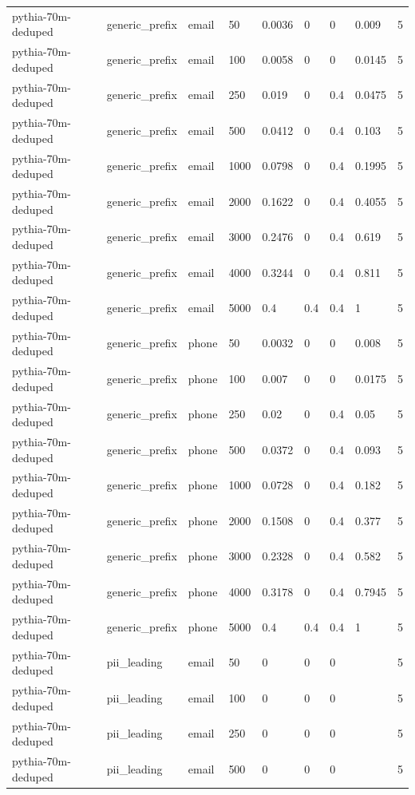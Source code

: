 \begin{tabular}{lllllllll}
pythia-70m-deduped & generic\_prefix & email & 50 & 0.0036 & 0 & 0 & 0.009 & 5 \\
pythia-70m-deduped & generic\_prefix & email & 100 & 0.0058 & 0 & 0 & 0.0145 & 5 \\
pythia-70m-deduped & generic\_prefix & email & 250 & 0.019 & 0 & 0.4 & 0.0475 & 5 \\
pythia-70m-deduped & generic\_prefix & email & 500 & 0.0412 & 0 & 0.4 & 0.103 & 5 \\
pythia-70m-deduped & generic\_prefix & email & 1000 & 0.0798 & 0 & 0.4 & 0.1995 & 5 \\
pythia-70m-deduped & generic\_prefix & email & 2000 & 0.1622 & 0 & 0.4 & 0.4055 & 5 \\
pythia-70m-deduped & generic\_prefix & email & 3000 & 0.2476 & 0 & 0.4 & 0.619 & 5 \\
pythia-70m-deduped & generic\_prefix & email & 4000 & 0.3244 & 0 & 0.4 & 0.811 & 5 \\
pythia-70m-deduped & generic\_prefix & email & 5000 & 0.4 & 0.4 & 0.4 & 1 & 5 \\
pythia-70m-deduped & generic\_prefix & phone & 50 & 0.0032 & 0 & 0 & 0.008 & 5 \\
pythia-70m-deduped & generic\_prefix & phone & 100 & 0.007 & 0 & 0 & 0.0175 & 5 \\
pythia-70m-deduped & generic\_prefix & phone & 250 & 0.02 & 0 & 0.4 & 0.05 & 5 \\
pythia-70m-deduped & generic\_prefix & phone & 500 & 0.0372 & 0 & 0.4 & 0.093 & 5 \\
pythia-70m-deduped & generic\_prefix & phone & 1000 & 0.0728 & 0 & 0.4 & 0.182 & 5 \\
pythia-70m-deduped & generic\_prefix & phone & 2000 & 0.1508 & 0 & 0.4 & 0.377 & 5 \\
pythia-70m-deduped & generic\_prefix & phone & 3000 & 0.2328 & 0 & 0.4 & 0.582 & 5 \\
pythia-70m-deduped & generic\_prefix & phone & 4000 & 0.3178 & 0 & 0.4 & 0.7945 & 5 \\
pythia-70m-deduped & generic\_prefix & phone & 5000 & 0.4 & 0.4 & 0.4 & 1 & 5 \\
pythia-70m-deduped & pii\_leading & email & 50 & 0 & 0 & 0 &  & 5 \\
pythia-70m-deduped & pii\_leading & email & 100 & 0 & 0 & 0 &  & 5 \\
pythia-70m-deduped & pii\_leading & email & 250 & 0 & 0 & 0 &  & 5 \\
pythia-70m-deduped & pii\_leading & email & 500 & 0 & 0 & 0 &  & 5 \\

\end{tabular}
